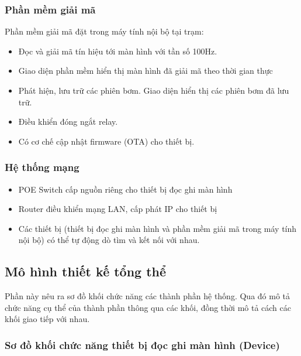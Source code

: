 \subsubsection{Phần mềm giải mã}

\hspace{0.8cm} Phần mềm giải mã đặt trong máy tính nội bộ tại trạm:

\begin{itemize}
    \item Đọc và giải mã tín hiệu tới màn hình với tần số 100Hz.
    \item Giao diện phần mềm hiển thị màn hình đã giải mã theo thời gian thực
    \item Phát hiện, lưu trữ các phiên bơm. Giao diện hiển thị các phiên bơm đã lưu trữ.
    \item Điều khiển đóng ngắt relay.
    \item Có cơ chế cập nhật firmware (OTA) cho thiết bị.    
\end{itemize}

\subsubsection{Hệ thống mạng}

\begin{itemize}
    \item POE Switch cấp nguồn riêng cho thiết bị đọc ghi màn hình
    \item Router điều khiển mạng LAN, cấp phát IP cho thiết bị
    \item Các thiết bị (thiết bị đọc ghi màn hình và phần mềm giải mã trong máy tính nội bộ) có thể tự động dò tìm và kết nối với nhau.
\end{itemize}

\subsection{Mô hình thiết kế tổng thể}

\hspace{0.8cm} Phần này nêu ra sơ đồ khối chức năng các thành phần hệ thống. Qua đó mô tả chức năng cụ thể của thành phần thông qua các khối, đồng thời mô tả cách các khối giao tiếp với nhau.

\subsubsection{Sơ đồ khối chức năng thiết bị đọc ghi màn hình (Device)}

